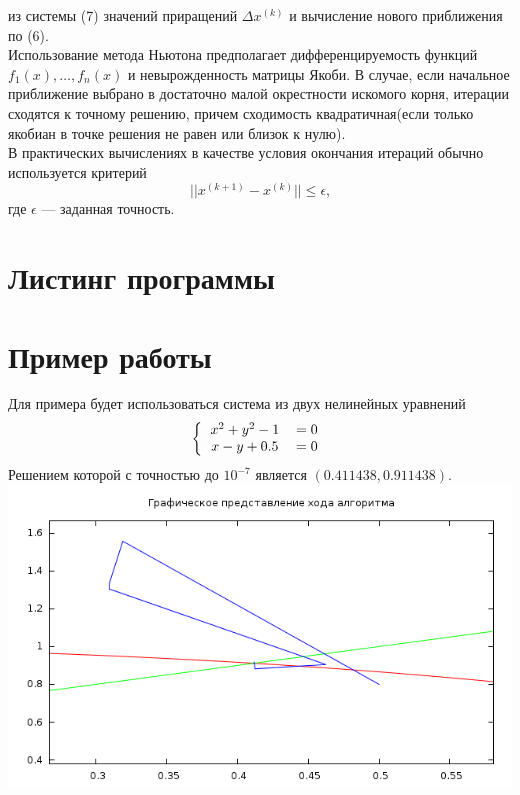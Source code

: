 \documentclass[a4paper, 12pt]{article}
\begin{document}
из системы (7) значений приращений $\Delta x^{(k)}$ и вычисление нового приближения по (6).\\
Использование метода Ньютона предполагает дифференцируемость функций $f_1(x),\ldots ,f_n(x)$ и невырожденность матрицы Якоби. В случае, если 
начальное приближение выбрано в достаточно малой окрестности искомого корня, итерации сходятся к точному решению, причем сходимость квадратичная(если только якобиан в точке решения не равен или близок к нулю).\\
В практических вычислениях в качестве условия окончания итераций обычно используется критерий 
\begin{equation}
	|| x^{(k+1)} - x^{(k)} || \leq \epsilon \text{,}
\end{equation}
где $\epsilon$ --- заданная точность.
\newpage
\section*{Листинг программы}


\newpage
\section*{Пример работы}
Для примера будет использоваться система из двух нелинейных уравнений 
\begin{equation}
	\left\{
		\begin{tabular}{cc}
			$x^2 + y^2 - 1 $&$ = 0$\\
			$x-y+0.5$&$ = 0$
		\end{tabular}
		\right.
\end{equation}
Решением которой с точностью до $10^{-7}$ является $(0.411438, 0.911438)$.
\includegraphics[width=\linewidth]{xs.png}
\end{document}
